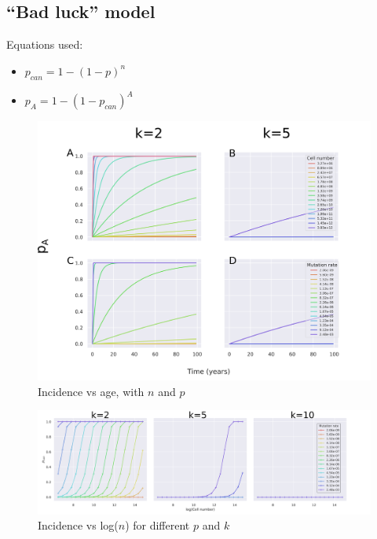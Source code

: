 \documentclass[a0,landscape]{a0poster}
\begin{document}
\begin{multicols}{3}
		\section{``Bad luck'' model}
		\begin{minipage}{.25\linewidth}
		Equations used:
		\begin{itemize}
			\item $p_{can}=1-(1-p)^{n}$
			\item $p_{A}=1-(1-p_{can})^A$
		\end{itemize}
		\end{minipage}
		\hspace{0.03\linewidth}
		\begin{minipage}{.65\linewidth}
			\begin{figure}[H]
				\flushright
				\includegraphics[width=\linewidth]{fig2.png}
				\caption{Incidence vs age, with $n$ and $p$}
			\end{figure}
		\end{minipage}


		\begin{minipage}{\linewidth}
		\begin{figure}[H]
			\flushright
			\includegraphics[width=\linewidth]{fig3.png}
			\caption{Incidence vs log($n$) for different $p$ and $k$}
		\end{figure}
		\end{minipage}


\end{multicols}
\end{document}
